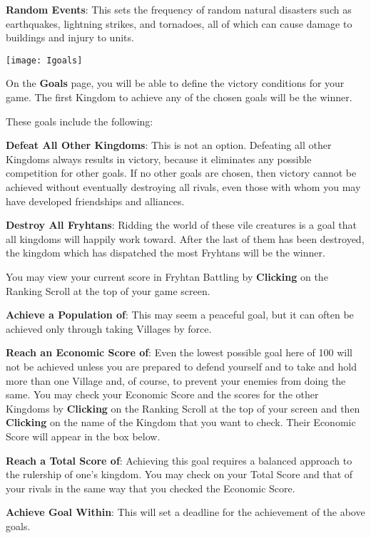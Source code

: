 \textbf{Random Events}: This sets the frequency of random natural disasters such as earthquakes, lightning strikes, and tornadoes, all of which can cause damage to buildings and injury to units.

\begin{center}
    \texttt{[image: Igoals]} %
\end{center}

On the \textbf{Goals} page, you will be able to define the victory conditions for your game. The first Kingdom to achieve any of the chosen goals will be the winner.

These goals include the following:

\textbf{Defeat All Other Kingdoms}: This is not an option. Defeating all other Kingdoms always results in victory, because it eliminates any possible competition for other goals. If no other goals are chosen, then victory cannot be achieved without eventually destroying all rivals, even those with whom you may have developed friendships and alliances.

\textbf{Destroy All Fryhtans}: Ridding the world of these vile creatures is a goal that all kingdoms will happily work toward. After the last of them has been destroyed, the kingdom which has dispatched the most Fryhtans will be the winner.

You may view your current score in Fryhtan Battling by \textbf{Clicking} on the Ranking Scroll at the top of your game screen.

\textbf{Achieve a Population of}: This may seem a peaceful goal, but it can often be achieved only through taking Villages by force.

\textbf{Reach an Economic Score of}: Even the lowest possible goal here of 100 will not be achieved unless you are prepared to defend yourself and to take and hold more than one Village and, of course, to prevent your enemies from doing the same. You may check your Economic Score and the scores for the other Kingdoms by \textbf{Clicking} on the Ranking Scroll at the top of your screen and then \textbf{Clicking} on the name of the Kingdom that you want to check. Their Economic Score will appear in the box below.

\textbf{Reach a Total Score of}: Achieving this goal requires a balanced approach to the rulership of one’s kingdom. You may check on your Total Score and that of your rivals in the same way that you checked the Economic Score.

\textbf{Achieve Goal Within}: This will set a deadline for the achievement of the above goals.

